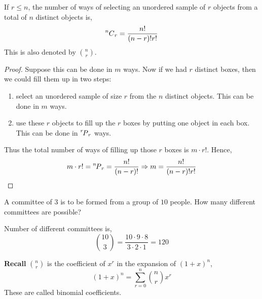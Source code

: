 \begin{theorem}
    If $r \leq n$, the number of ways of selecting an unordered sample of $r$
objects from a total of $n$ distinct objects is,
\begin{equation*}
    \comb[n]{r} = \frac{n!}{(n - r)!r!}
\end{equation*}
This is also denoted by $n \choose r$.
\end{theorem}
\begin{proof}
    Suppose this can be done in $m$ ways. Now if we had $r$ distinct boxes,
then we could fill them up in two steps:
\begin{enumerate}[noitemsep,topsep=0pt]
\item 
    select an unordered sample of size $r$ from the $n$ distinct objects.
    This can be done in $m$ ways.
\item
    use these $r$ objects to fill up the $r$ boxes by putting one object in
    each box. This can be done in $\perm[r]{r}$ ways.
\end{enumerate}
Thus the total number of ways of filling up those $r$ boxes is $m \cdot
r!$. Hence,
\begin{equation*}
    m \cdot r! = \perm[n]{r} = \frac{n!}{(n - r)!}
    \Rightarrow
    m = \frac{n!}{(n - r)!r!}
\end{equation*}
\end{proof}

\begin{example}
    A committee of $3$ is to be formed from a group of $10$ people. How many
different committees are possible?
\end{example}
\begin{solution}
    Number of different committees is,
    \begin{equation*}
        {10 \choose 3} = \frac{10 \cdot 9 \cdot 8}{3 \cdot 2 \cdot 1} = 120
    \end{equation*}
\end{solution}

\noindent \textbf{Recall} ${n \choose r}$ is the coefficient of $x^r$ in the
expansion of $(1+x)^n$,
\begin{equation*}
    (1+x)^n = \sum_{r = 0}^n {n \choose r} x^r
\end{equation*}
These are called binomial coefficients. 

